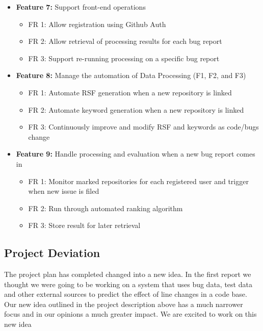 \documentclass[11pt,]{article}
\providecommand{\tightlist}{%
  \setlength{\itemsep}{0pt}\setlength{\parskip}{0pt}}
\begin{document}
\begin{itemize}
\tightlist
\item
  \textbf{Feature 7:} Support front-end operations

  \begin{itemize}
  \tightlist
  \item
    FR 1: Allow registration using Github Auth
  \item
    FR 2: Allow retrieval of processing results for each bug report
  \item
    FR 3: Support re-running processing on a specific bug report
  \end{itemize}
\item
  \textbf{Feature 8:} Manage the automation of Data Processing (F1, F2,
  and F3)

  \begin{itemize}
  \tightlist
  \item
    FR 1: Automate RSF generation when a new repository is linked
  \item
    FR 2: Automate keyword generation when a new repository is linked
  \item
    FR 3: Continuously improve and modify RSF and keywords as code/bugs
    change
  \end{itemize}
\item
  \textbf{Feature 9:} Handle processing and evaluation when a new bug
  report comes in

  \begin{itemize}
  \tightlist
  \item
    FR 1: Monitor marked repositories for each registered user and
    trigger when new issue is filed
  \item
    FR 2: Run through automated ranking algorithm
  \item
    FR 3: Store result for later retrieval
  \end{itemize}
\end{itemize}

\hypertarget{project-deviation}{%
\subsection{Project Deviation}\label{project-deviation}}

The project plan has completed changed into a new idea. In the first
report we thought we were going to be working on a system that uses bug
data, test data and other external sources to predict the effect of line
changes in a code base. Our new idea outlined in the project description
above has a much narrower focus and in our opinions a much greater
impact. We are excited to work on this new idea
\end{document}
